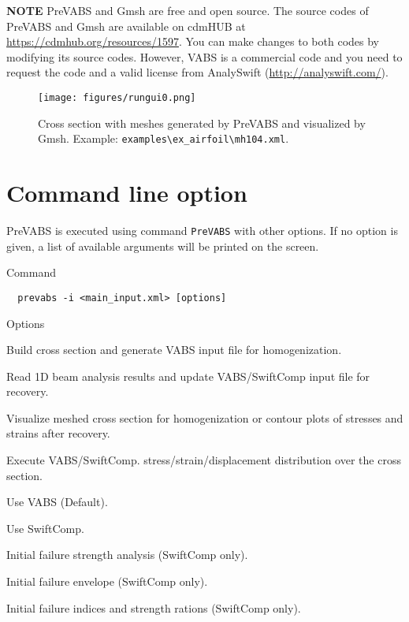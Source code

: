 \documentclass{book}
\begin{document}
\textbf{NOTE} PreVABS and Gmsh are free and open source. The source codes 
of PreVABS and Gmsh are available on cdmHUB at \url{https://cdmhub.org/resources/1597}. 
You can make changes to both codes by modifying its source codes. However, 
VABS is a commercial code and you need to request the code and a valid 
license from AnalySwift (\url{http://analyswift.com/}).

\begin{figure}
  \centerline{\texttt{[image: figures/rungui0.png]}}
  \caption{Cross section with meshes generated by PreVABS and visualized 
    by Gmsh. Example: \texttt{examples\textbackslash{}ex\_airfoil\textbackslash{}mh104.xml}.}
  \label{fig:quickstart}
\end{figure}


\section{Command line option}
\label{sec:command_option}

PreVABS is executed using command \lstinline|PreVABS| with other options. 
If no option is given, a list of available arguments will be printed on the screen.

Command

\begin{lstlisting}
  prevabs -i <main_input.xml> [options]
\end{lstlisting}

Options
\begin{description}[align=right,labelwidth=0.5in]
  \item [\texttt{-h}] Build cross section and generate VABS input file 
    for homogenization.
  \item [\texttt{-d}] Read 1D beam analysis results and update VABS/SwiftComp
    input file for recovery.
  \item [\texttt{-v}] Visualize meshed cross section for homogenization 
    or contour plots of stresses and strains after recovery.
  \item [\texttt{-e}] Execute VABS/SwiftComp.
    stress/strain/displacement distribution over the cross section.
  \item [\texttt{-vabs}] Use VABS (Default).
  \item [\texttt{-sc}] Use SwiftComp.
  \item [\texttt{-f}] Initial failure strength analysis (SwiftComp only).
  \item [\texttt{-fe}] Initial failure envelope (SwiftComp only).
  \item [\texttt{-f}] Initial failure indices and strength rations (SwiftComp only).
\end{description}
\end{document}
